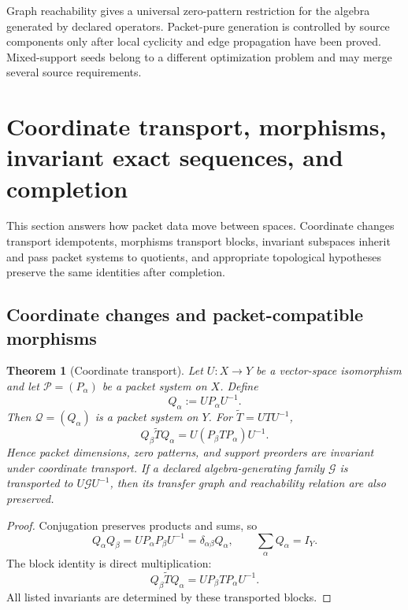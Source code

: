 \documentclass[11pt]{article}
\newtheorem{theorem}{Theorem}[section]
\theoremstyle{definition}
\theoremstyle{remark}
\theoremstyle{definition}\newtheorem{example}[theorem]{Example}
\newcommand{\Pcal}{\mathcal P}
\newcommand{\Qcal}{\mathcal Q}
\newcommand{\RecordID}[1]{\label{record:#1}}
\newcommand{\Depends}[1]{}
\begin{document}
\begin{sectionrecap}
Graph reachability gives a universal zero-pattern restriction for the algebra generated by declared operators.  Packet-pure generation is controlled by source components only after local cyclicity and edge propagation have been proved.  Mixed-support seeds belong to a different optimization problem and may merge several source requirements.
\end{sectionrecap}


\section{Coordinate transport, morphisms, invariant exact sequences, and completion}
\begin{readerroadmap}
This section answers how packet data move between spaces.  Coordinate changes transport idempotents, morphisms transport blocks, invariant subspaces inherit and pass packet systems to quotients, and appropriate topological hypotheses preserve the same identities after completion.
\end{readerroadmap}
\subsection{Coordinate changes and packet-compatible morphisms}

\begin{theorem}[Coordinate transport]
\label{thm:coordinate-transport}
Let $U:X\to Y$ be a vector-space isomorphism and let $\Pcal=(P_\alpha)$ be a packet system on $X$.  Define
\[
Q_\alpha:=UP_\alpha U^{-1}.
\]
Then $\Qcal=(Q_\alpha)$ is a packet system on $Y$.  For $\widetilde T=UTU^{-1}$,
\[
\boxed{
Q_\beta\widetilde TQ_\alpha
=
U(P_\beta TP_\alpha)U^{-1}.
}
\]
Hence packet dimensions, zero patterns, and support preorders are invariant under coordinate transport.  If a declared algebra-generating family $\mathcal G$ is transported to $U\mathcal G U^{-1}$, then its transfer graph and reachability relation are also preserved.
\end{theorem}
\RecordID{PSC-I-T-COORDINATE-TRANSPORT}
\Depends{PSC-I-D-PACKET-SYSTEM and PSC-I-D-TRANSFER-BLOCK.}

\begin{proof}
Conjugation preserves products and sums, so
\[
Q_\alpha Q_\beta
=UP_\alpha P_\beta U^{-1}
=\delta_{\alpha\beta}Q_\alpha,
\qquad
\sum_\alpha Q_\alpha=I_Y.
\]
The block identity is direct multiplication:
\[
Q_\beta\widetilde TQ_\alpha
=UP_\beta TP_\alpha U^{-1}.
\]
All listed invariants are determined by these transported blocks.
\end{proof}
\end{document}
